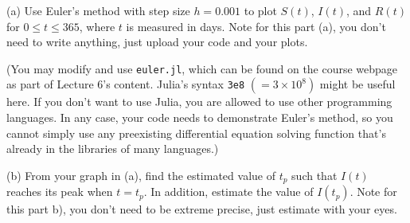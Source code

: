 \documentclass[11pt]{article}
\theoremstyle{definition}
\begin{document}
\begin{enumerate}[leftmargin=*]
(a) Use Euler's method with step size $h=0.001$ to plot $S(t)$, $I(t)$, and $R(t)$ for $0\leq t\leq 365$, where $t$ is measured in days.  Note for this part (a), you don't need to write anything, just upload your code and your plots.  

(You may modify and use \verb+euler.jl+, which can be found on the course webpage as part of Lecture 6's content.  Julia's syntax \verb+3e8+ $(= 3\times 10^8)$ might be useful here. If you don't want to use Julia, you are allowed to use other programming languages.  In any case, your code needs to demonstrate Euler's method, so you cannot simply use any preexisting differential equation solving function that's already in the libraries of many languages.)

(b) From your graph in (a), find the estimated value of $t_p$ such that $I(t)$ reaches its peak when $t=t_p$.  In addition, estimate the value of $I(t_p)$.  Note for this part b), you don't need to be extreme precise, just estimate with your eyes.  





\end{enumerate}
 
 
\end{document}
